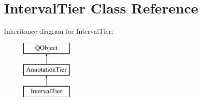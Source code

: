 \hypertarget{class_interval_tier}{}\section{Interval\+Tier Class Reference}
\label{class_interval_tier}
Inheritance diagram for Interval\+Tier\+:\begin{figure}[H]
\begin{center}
\leavevmode
\includegraphics[height=3.000000cm]{class_interval_tier}
\end{center}
\end{figure}

